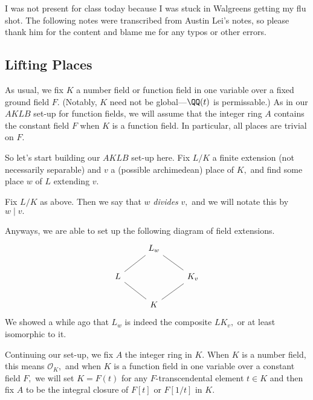 













I was not present for class today because I was stuck in Walgreens getting my flu shot. The following notes were transcribed from Austin Lei's notes, so please thank him for the content and blame me for any typos or other errors.

\subsection{Lifting Places}
As usual, we fix $K$ a number field or function field in one variable over a fixed ground field $F.$ (Notably, $K$ need not be global---$\QQ(t)$ is permissable.) As in our $AKLB$ set-up for function fields, we will assume that the integer ring $A$ contains the constant field $F$ when $K$ is a function field. In particular, all places are trivial on $F.$

So let's start building our $AKLB$ set-up here. Fix $L/K$ a finite extension (not necessarily separable) and $v$ a (possible archimedean) place of $K,$ and find some place $w$ of $L$ extending $v.$
\begin{defi}
	Fix $L/K$ as above. Then we say that $w$ \textit{divides} $v,$ and we will notate this by $w\mid v.$
\end{defi}
Anyways, we are able to set up the following diagram of field extensions.
\[\begin{tikzcd}
	& {L_w} \\
	L && {K_v} \\
	& K
	\arrow[no head, from=1-2, to=2-1]
	\arrow[no head, from=2-1, to=3-2]
	\arrow[no head, from=1-2, to=2-3]
	\arrow[no head, from=2-3, to=3-2]
\end{tikzcd}\]
We showed a while ago that $L_w$ is indeed the composite $LK_v,$ or at least isomorphic to it.

Continuing our set-up, we fix $A$ the integer ring in $K.$ When $K$ is a number field, this means $\mathcal O_K,$ and when $K$ is a function field in one variable over a constant field $F,$ we will set $K=F(t)$ for any $F$-transcendental element $t\in K$ and then fix $A$ to be the integral closure of $F[t]$ or $F[1/t]$ in $K.$

